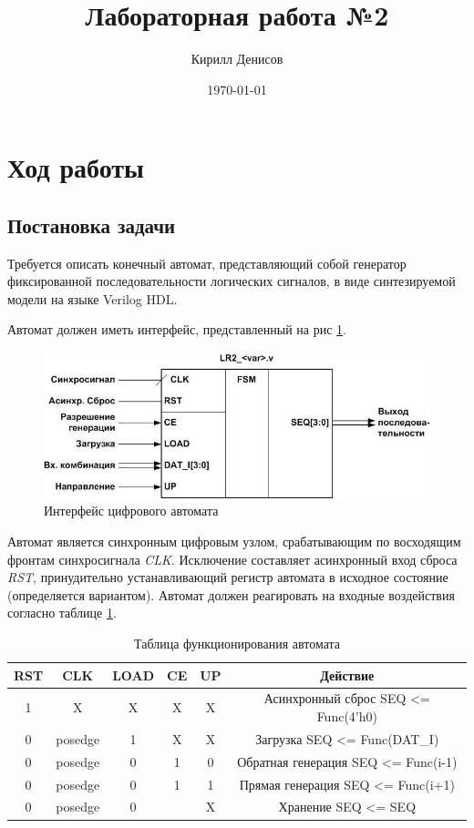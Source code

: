 \documentclass[a4paper,14pt]{extarticle}
\author{Кирилл Денисов}
\title{Лабораторная работа №2}
\date{\today}
\newcommand{\pathToCommonFolder}{/home/denilai/Documents/repos/latex/Common}
\begin{document}
	\thispagestyle{empty}
	
	\newpage
	\tableofcontents
	\newpage
\section{Ход работы}	
\subsection {Постановка задачи}
Требуется описать конечный автомат, представляющий собой генератор
фиксированной последовательности логических сигналов, в виде синтезируемой модели
на языке Verilog HDL.

Автомат должен иметь интерфейс, представленный на рис \ref{fig:fsmexample}.

\begin{figure}[htpb]
	\centering
	\includegraphics[width=0.5\linewidth]{images/fsm_example}
	\caption{Интерфейс цифрового автомата}
	\label{fig:fsmexample}
\end{figure}


Автомат является синхронным цифровым узлом, срабатывающим по восходящим
фронтам синхросигнала \textit{CLK}. Исключение составляет асинхронный вход сброса \textit{RST},
принудительно устанавливающий регистр автомата в исходное состояние (определяется
вариантом).
Автомат должен реагировать на входные воздействия согласно таблице \ref{tab:fsm state}.


\begin{table}[htbp]
		\begin{tabular}{|c|c|c|c|c|c|}
		\hline
		\textbf{RST}  & \textbf{CLK}  & \textbf{LOAD}  & \textbf{CE}  & \textbf{UP}  & \textbf{Действие} \\ \hline \hline
		1 & X  & X  & X  & X  & Асинхронный сброс SEQ <= Func(4'h0) \\ \hline
		0 & posedge & 1 & X  & X  & Загрузка SEQ <= Func(DAT\_I) \\ \hline
		0 & posedge & 0 & 1 & 0 & Обратная генерация SEQ <= Func(i-1) \\ \hline
		0 & posedge & 0 & 1 & 1 & Прямая генерация SEQ <= Func(i+1) \\ \hline
		0 & posedge & 0 &  & X  & Хранение SEQ <= SEQ \\ \hline
	\end{tabular}
	\caption{Таблица функционирования автомата}
	\label{tab:fsm state}
\end{table}
\end{document}
